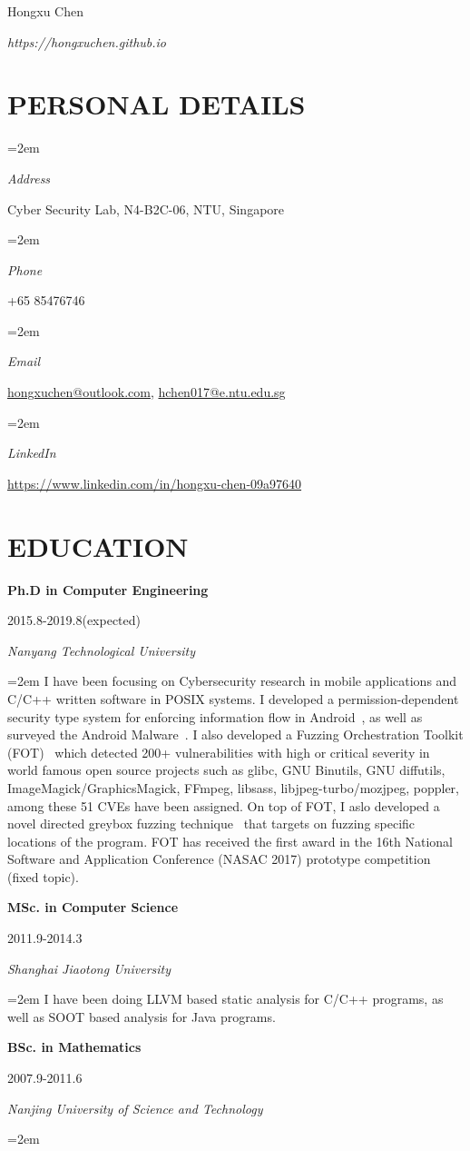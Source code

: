 \documentclass[paper=a4,fontsize=11pt]{article} %
\newlength{\spacebox}
\newcommand{\sepspace}{\vspace*{9pt}}		%
\newcommand{\MyName}[1]{ %
		\Huge \usefont{OT1}{phv}{b}{n} \hfill #1
		\par \normalsize \normalfont}
\newcommand{\MySlogan}[1]{ %
		\large \usefont{OT1}{phv}{m}{n}\hfill \textit{#1}
		\par \normalsize \normalfont}
\newcommand{\NewPart}[1]{\section*{\uppercase{#1}}}
\newcommand{\PersonalEntry}[2]{
		\noindent\hangindent=2em\hangafter=0 %
		\parbox{\spacebox}{        %
		\textit{#1}}		       %
		\hspace{1.5em} #2 \par}    %
\newcommand{\EducationEntry}[4]{
		\noindent \textbf{#1} \hfill      %
			\parbox{12em}{%
			\hfill\color{Black}#2} \par  %
		\noindent \textit{#3} \par        %
		\noindent\hangindent=2em\hangafter=0 \small #4 %
		\normalsize \par}
\begin{document}
\nocite{*}


\MyName{Hongxu Chen}
\MySlogan{{https://hongxuchen.github.io}}


\sepspace

\NewPart{Personal details}{}

\PersonalEntry{Address}{Cyber Security Lab, N4-B2C-06, NTU, Singapore}
\PersonalEntry{Phone}{+65 85476746}
\PersonalEntry{Email}{\url{hongxuchen@outlook.com}, \url{hchen017@e.ntu.edu.sg}}
\PersonalEntry{LinkedIn}{\url{https://www.linkedin.com/in/hongxu-chen-09a97640}}

\NewPart{Education}{}

\EducationEntry{Ph.D in Computer Engineering}{2015.8-2019.8(expected)}{Nanyang Technological University}{
    I have been focusing on Cybersecurity research in mobile applications and C/C++ written software in POSIX systems. I developed a permission-dependent security type system for enforcing information flow in Android~\cite{sta}, as well as surveyed the Android Malware~\cite{XueM0TC0Z17}. I also developed a Fuzzing Orchestration Toolkit (FOT)~\cite{fse18-fot} which detected 200+ vulnerabilities with high or critical severity in world famous open source projects such as glibc, GNU Binutils, GNU diffutils, ImageMagick/GraphicsMagick, FFmpeg, libsass, libjpeg-turbo/mozjpeg, poppler, among these 51 CVEs have been assigned. On top of FOT, I aslo developed a novel directed greybox fuzzing technique~\cite{hawkeye} that targets on fuzzing specific locations of the program. FOT has received the first award in the 16th National Software and Application Conference (NASAC 2017) prototype competition (fixed topic).
}
\sepspace

\EducationEntry{MSc. in Computer Science}{2011.9-2014.3}{Shanghai Jiaotong University}{
  I have been doing LLVM based static analysis for C/C++ programs, as well as SOOT based analysis for Java programs.}
\sepspace

\EducationEntry{BSc. in Mathematics}{2007.9-2011.6}{Nanjing University of Science and Technology}{}
\end{document}
